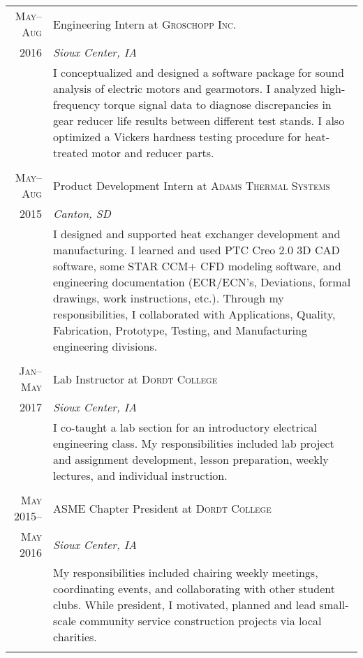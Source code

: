 \documentclass[a4paper,10pt]{article} %
\begin{document}
\begin{tabular}{r|p{11cm}}
\textsc{May--Aug} & Engineering Intern at \textsc{Groschopp Inc.} \emph{} \\ 
\textsc{2016} & \emph{Sioux Center, IA} \\
& \footnotesize{
I conceptualized and designed a software package for sound analysis of electric motors and gearmotors. I analyzed high-frequency torque signal data to diagnose discrepancies in gear reducer life results between different test stands. I also optimized a Vickers hardness testing procedure for heat-treated motor and reducer parts.
} \\
\multicolumn{2}{c}{} \\


\textsc{May--Aug} & Product Development Intern at \textsc{Adams Thermal Systems} \emph{}\\
\textsc{2015} & \emph{Canton, SD} \\
& \footnotesize{
I designed and supported heat exchanger development and manufacturing. I learned and used PTC Creo 2.0 3D CAD software, some STAR CCM+ CFD modeling software, and engineering documentation (ECR/ECN’s, Deviations, formal drawings, work instructions, etc.). Through my responsibilities, I collaborated with Applications, Quality, Fabrication, Prototype, Testing, and Manufacturing engineering divisions.
} \\
\multicolumn{2}{c}{} \\


\textsc{Jan--May} & Lab Instructor at \textsc{Dordt College} \emph{}\\
\textsc{2017} & \emph{Sioux Center, IA} \\
& \footnotesize{
I co-taught a lab section for an introductory electrical engineering class. My responsibilities included lab project and assignment development, lesson preparation, weekly lectures, and individual instruction.
} \\
\multicolumn{2}{c}{} \\


\textsc{May 2015--} & ASME Chapter President at \textsc{Dordt College} \emph{}\\
\textsc{May 2016} & \emph{Sioux Center, IA} \\
& \footnotesize{
My responsibilities included chairing weekly meetings, coordinating events, and collaborating with other student clubs. While president, I motivated, planned and lead small-scale community service construction projects via local charities.
} \\
\multicolumn{2}{c}{} \\


\end{tabular}
\end{document}
